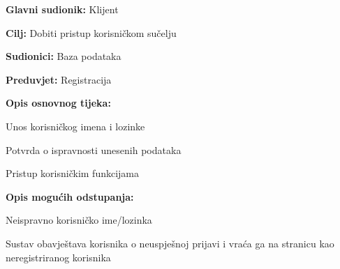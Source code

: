 										\noindent {}
					\begin{packed_item}
	
						\item \textbf{Glavni sudionik: }Klijent
						\item  \textbf{Cilj:} Dobiti pristup korisničkom sučelju
						\item  \textbf{Sudionici:} Baza podataka
						\item  \textbf{Preduvjet:} Registracija
						\item  \textbf{Opis osnovnog tijeka:						
						}
						
						\item[] \begin{packed_enum}
	
							\item Unos korisničkog imena i lozinke
							\item Potvrda o ispravnosti unesenih podataka
							\item Pristup korisničkim funkcijama
							
						\end{packed_enum}
						
						\item  \textbf{Opis mogućih odstupanja:}
						
						\item[] \begin{packed_item}
	
							\item[2.a] Neispravno korisničko ime/lozinka
							\item[] \begin{packed_enum}
								
								\item Sustav obavještava korisnika o neuspješnoj prijavi i vraća ga na stranicu kao neregistriranog korisnika
																
							\end{packed_enum}
														
						\end{packed_item}
					\end{packed_item}

